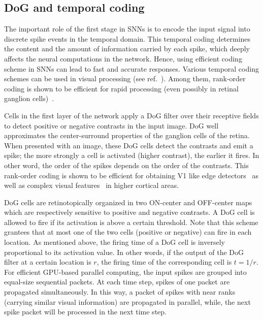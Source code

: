 \documentclass[preprint,5p,12pt,twocolumn]{article}
\begin{document}
\subsection*{DoG and temporal coding}
The important role of the first stage in SNNs is to encode the input signal into discrete spike events in the temporal domain. This temporal coding  determines the content and the amount of information carried by each spike, which deeply affects the neural computations in the network. Hence, using efficient coding scheme in SNNs can lead to fast and accurate responses. Various temporal coding schemes can be used in visual processing (see ref.~\cite{thorpe2001spike}). Among them, rank-order coding is shown to be efficient for rapid processing (even possibly in retinal ganglion cells)~\cite{van2001rate,portelli2016rank}. 

Cells in the first layer of the network apply a DoG filter over their receptive fields to detect positive or negative contrasts in the input image. DoG well approximates the center-surround properties of the ganglion cells of the retina. When presented with an image, these DoG cells detect the contrasts and emit a spike; the more strongly a cell is activated (higher contrast), the earlier it fires.  In other word, the order of the spikes depends on the order of the contrasts. This rank-order coding is shown to be efficient for obtaining V1 like edge detectors~\cite{delorme2001networks} as well as complex visual features~\cite{masquelier2007unsupervised,kheradpisheh2016bio}  in higher cortical areas. 

DoG cells are retinotopically organized in two ON-center and OFF-center maps which are respectively sensitive to positive and negative contrasts. A DoG cell is allowed to fire if its activation is above a certain threshold. Note that this scheme grantees that at most one of the two cells (positive or negative) can fire in each location.  As mentioned above, the firing time of a DoG cell is inversely proportional to its activation value. In other words, if the output of the DoG filter at a certain location is $r$, the firing time of the corresponding cell is $t=1/r$. For efficient GPU-based parallel computing, the input spikes are grouped into equal-size sequential packets. At each time step, spikes of one packet are propagated simultaneously. In this way, a packet of spikes with near ranks (carrying similar visual information) are propagated in parallel, while, the next spike packet will be processed in the next time step.
\end{document}
